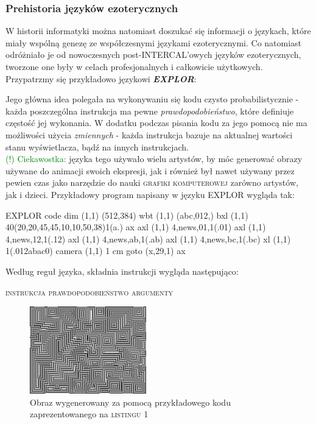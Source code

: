 \documentclass[fleqn,10pt]{SelfArx} %
\begin{document}
\subsubsection{Prehistoria języków ezoterycznych}
W historii informatyki można natomiast doszukać się informacji o językach, 
które miały wspólną genezę ze współczesnymi językami
ezoterycznymi. Co natomiast odróżniało je od nowoczesnych post-INTERCAL'owych języków ezoterycznych, 
tworzone one były w celach profesjonalnych i całkowicie użytkowych.
Przypatrzmy się przykładowo językowi \textbf{\textit{EXPLOR}}: 
\begin{adjustwidth}{1cm}{0cm}
	Jego główna idea polegała na wykonywaniu się kodu czysto probabilistycznie - każda poszczególna instrukcja ma pewne \textit{prawdopodobieństwo}, 
	które definiuje częstość jej wykonania. W dodatku podczas pisania kodu za jego pomocą nie ma możliwości użycia
	\textit{zmiennych} - każda instrukcja bazuje na aktualnej wartości stanu wyświetlacza, bądź na innych instrukcjach.
	\\\textcolor{green}{(!) Ciekawostka:} języka tego używało wielu artystów, by móc generować obrazy używane do animacji swoich ekspresji, 
	jak i również był nawet używany przez pewien czas jako narzędzie do nauki \textsc{grafiki komputerowej} zarówno artystów, jak i dzieci.
	Przykładowy program napisany w języku EXPLOR wygląda tak:
\end{adjustwidth}
\begin{sexylisting}{EXPLOR code}
  dim    (1,1)    (512,384)
  wbt    (1,1)    (abc,012,)
  bxl    (1,1)    40(20,20,45,45,10,10,50,38)1(a.)
ax axl   (1,1)    4,news,01,1(.01)
  axl    (1,1)    4,news,12,1(.12)
  axl    (1,1)    4,news,ab,1(.ab)
  axl    (1,1)    4,news,bc,1(.bc)
  xl     (1,1)    1(.012abac0)
  camera (1,1)    1
cm goto  (x,29,1) ax
\end{sexylisting}
	Według reguł języka, składnia instrukcji wygląda następująco:
	\begin{center}
		\textsc{instrukcja prawdopodobieństwo argumenty}
	\end{center}
\begin{figure}[H] %
	\centering %
	\includegraphics[width=0.45\textwidth]{Figures/Explor_example.png} %
	\caption{Obraz wygenerowany za pomocą przykładowego kodu zaprezentowanego na \textsc{listingu 1}}
\end{figure}
\end{document}
